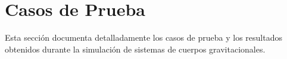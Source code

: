 \section{Casos de Prueba}

Esta sección documenta detalladamente los casos de prueba y los resultados obtenidos durante la simulación de sistemas de cuerpos gravitacionales.





